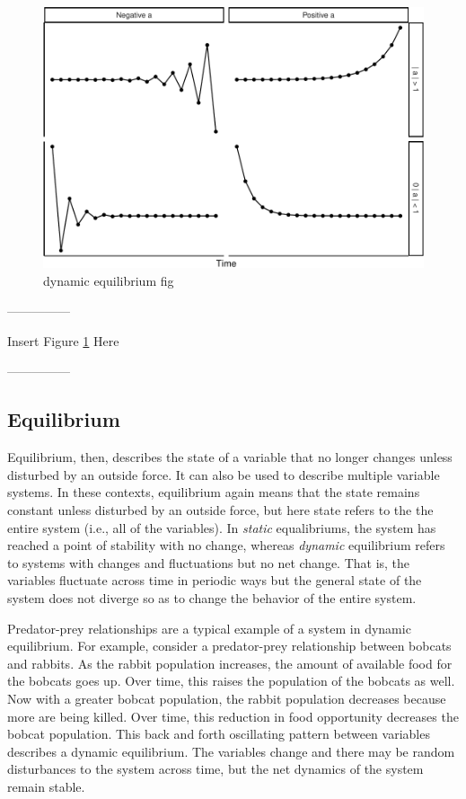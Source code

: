 \documentclass[english,,man]{apa6}
\theoremstyle{definition}
\theoremstyle{definition}
\theoremstyle{definition}
\theoremstyle{remark}
\begin{document}
\begin{figure}
\centering
\includegraphics{figs/unnamed-chunk-7-1.pdf}
\caption{\label{fig:unnamed-chunk-7}dynamic equilibrium
fig\label{dynamics_plot}}
\end{figure}

\begin{center}

---------------

Insert Figure \ref{dynamics_plot} Here

---------------

\end{center}

\hypertarget{equilibrium}{%
\subsection{Equilibrium}\label{equilibrium}}

Equilibrium, then, describes the state of a variable that no longer
changes unless disturbed by an outside force. It can also be used to
describe multiple variable systems. In these contexts, equilibrium again
means that the state remains constant unless disturbed by an outside
force, but here state refers to the the entire system (i.e., all of the
variables). In \emph{static} equalibriums, the system has reached a
point of stability with no change, whereas \emph{dynamic} equilibrium
refers to systems with changes and fluctuations but no net change. That
is, the variables fluctuate across time in periodic ways but the general
state of the system does not diverge so as to change the behavior of the
entire system.

Predator-prey relationships are a typical example of a system in dynamic
equilibrium. For example, consider a predator-prey relationship between
bobcats and rabbits. As the rabbit population increases, the amount of
available food for the bobcats goes up. Over time, this raises the
population of the bobcats as well. Now with a greater bobcat population,
the rabbit population decreases because more are being killed. Over
time, this reduction in food opportunity decreases the bobcat
population. This back and forth oscillating pattern between variables
describes a dynamic equilibrium. The variables change and there may be
random disturbances to the system across time, but the net dynamics of
the system remain stable.
\end{document}
